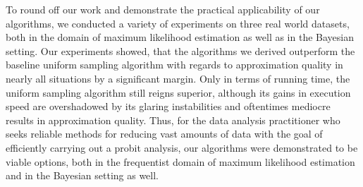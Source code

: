 To round off our work and demonstrate the practical applicability
of our algorithms, we conducted a variety of experiments
on three real world datasets, both in the domain of maximum
likelihood estimation as well as in the Bayesian setting.
Our experiments showed, that the algorithms we derived
outperform the baseline uniform sampling algorithm with
regards to approximation quality in
nearly all situations by a significant margin.
Only in terms of running time, the uniform sampling algorithm
still reigns superior, although its gains in execution speed
are overshadowed by its glaring instabilities and oftentimes
mediocre results in approximation quality.
Thus, for the data analysis practitioner who seeks reliable
methods for reducing vast amounts of data with the goal
of efficiently carrying out a probit analysis,
our algorithms were demonstrated to be
viable options, both in the frequentist domain of maximum
likelihood estimation and in the Bayesian setting as well.
